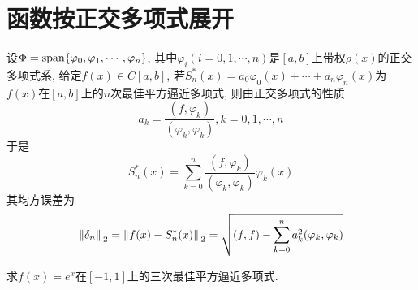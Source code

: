 \section{函数按正交多项式展开}

设$\Phi=\text{span}\{\varphi_0,\varphi_1,\cdots,\varphi_n\}$, 其中$\varphi_i(i=0,1,\cdots,n)$是$[a,b]$上带权$\rho(x)$的正交多项式系, 给定$f(x)\in C[a,b]$, 若$S_n^*(x)=a_0\varphi_0(x)+\cdots+a_n\varphi_n(x)$为$f(x)$在$[a,b]$上的$n$次最佳平方逼近多项式, 则由正交多项式的性质
\begin{equation*}
    a_k=\frac{(f,\varphi_k)}{(\varphi_k,\varphi_k)}, k=0,1,\cdots,n
\end{equation*}
于是
\begin{equation*}
    S_n^*(x)=\sum_{k=0}^n\frac{(f,\varphi_k)}{(\varphi_k,\varphi_k)}\varphi_k(x)
\end{equation*}
其均方误差为
\begin{equation*}
    \norm*{\delta_n}_2=\norm*{f(x)-S_n^*(x)}_2=\sqrt{(f,f)-\sum_{k=0}^n a_k^2(\varphi_k,\varphi_k)}
\end{equation*}

\begin{example}
    求$f(x)=e^x$在$[-1,1]$上的三次最佳平方逼近多项式.
\end{example}

